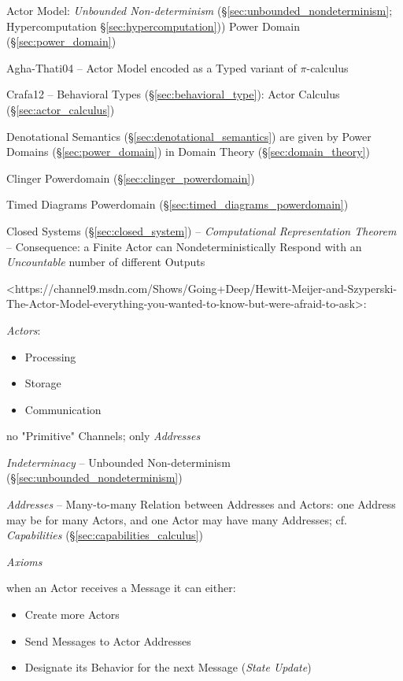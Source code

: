 Actor Model: \emph{Unbounded Non-determinism}
(\S\ref{sec:unbounded_nondeterminism}; \fist Hypercomputation
\S\ref{sec:hypercomputation})) Power Domain (\S\ref{sec:power_domain})

Agha-Thati04 -- Actor Model encoded as a Typed variant of
$\pi$-calculus

Crafa12 -- Behavioral Types (\S\ref{sec:behavioral_type}): Actor
Calculus (\S\ref{sec:actor_calculus})

Denotational Semantics (\S\ref{sec:denotational_semantics}) are given
by Power Domains (\S\ref{sec:power_domain}) in Domain Theory
(\S\ref{sec:domain_theory})

Clinger Powerdomain (\S\ref{sec:clinger_powerdomain})

Timed Diagrams Powerdomain (\S\ref{sec:timed_diagrams_powerdomain})

Closed Systems (\S\ref{sec:closed_system}) -- \emph{Computational
  Representation Theorem} -- Consequence: a Finite Actor can
Nondeterministically Respond with an \emph{Uncountable} number of
different Outputs %

<https://channel9.msdn.com/Shows/Going+Deep/Hewitt-Meijer-and-Szyperski-The-Actor-Model-everything-you-wanted-to-know-but-were-afraid-to-ask>:

\emph{Actors}:

\begin{itemize}
\item Processing
\item Storage
\item Communication
\end{itemize}

no "Primitive" Channels; only \emph{Addresses}

\emph{Indeterminacy} -- Unbounded Non-determinism
(\S\ref{sec:unbounded_nondeterminism})

\emph{Addresses} -- Many-to-many Relation between Addresses and
Actors: one Address may be for many Actors, and one Actor may have
many Addresses; cf. \emph{Capabilities}
(\S\ref{sec:capabilities_calculus})

\emph{Axioms} %

when an Actor receives a Message it can either:
\begin{itemize}
\item Create more Actors
\item Send Messages to Actor Addresses
\item Designate its Behavior for the next Message (\emph{State Update})
\end{itemize}


